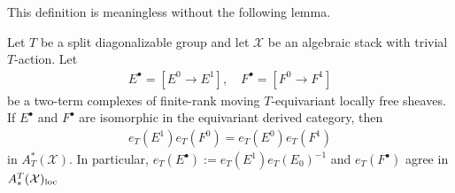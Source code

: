 \documentclass[12pt,dvipsnames]{amsart}
\begin{document}
This definition is meaningless without the following lemma.

\begin{lemma}\label{lem:euler-class-well-defined}
  Let \(T\) be a split diagonalizable group and let \(\mathcal X\) be an algebraic stack with trivial \(T\)-action. Let
  \begin{align*}
    E^\bullet = [E^0 \to E^1], \hspace{1em} F^\bullet = [F^0 \to F^1]
  \end{align*}
  be a two-term complexes of finite-rank moving \(T\)-equivariant locally free sheaves. If \(E^\bullet\) and \(F^\bullet\) are isomorphic in the equivariant derived category, then
  \begin{align*}
    e_T(E^1)e_T(F^0) = e_T(E^0)e_T(F^1)
  \end{align*}
  in \(A^*_T(\mathcal X)\). In particular, \(e_T(E^\bullet) := e_T(E^1)e_T(E_0)^{-1}\) and \(e_T(F^\bullet)\) agree in \(A_*^T(\mathcal X)_{\operatorname{loc}}\)
\end{lemma}
\end{document}
